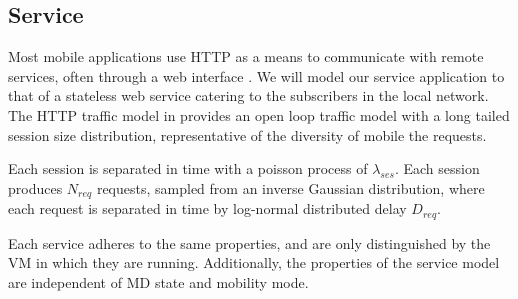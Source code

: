 \subsection{Service}
Most mobile applications use HTTP as a means to communicate with remote services, often through a web interface \cite{maier2010first,falaki2010first}. We will model our service application to that of a stateless web service catering to the subscribers in the local network. The HTTP traffic model in \cite{liu2001traffic} provides an open loop traffic model with a long tailed session size distribution, representative of the diversity of mobile the requests. 

Each session is separated in time with a poisson process of $\lambda_{ses}$. Each session produces $N_{req}$ requests, sampled from an inverse Gaussian distribution, where each request is separated in time by log-normal distributed delay $D_{req}$.

Each service adheres to the same properties, and are only distinguished by the \ac{VM} in which they are running. Additionally, the properties of the service model are independent of \ac{MD} state and mobility mode.

